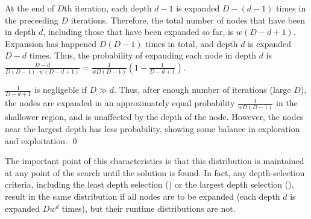 At the end of $D$th iteration,
each depth $d-1$ is expanded $D-(d-1)$ times in the preceeding $D$ iterations.
Therefore, the total number of nodes that have been in depth $d$, including those
that have been expanded so far, is $w(D-d+1)$.
Expansion has happened $D(D-1)$ times in total, and depth $d$ is expanded $D-d$ times.
Thus, the probability of expanding each node in depth $d$ is
$\frac{D-d}{D(D-1)\cdot w(D-d+1)}=\frac{1}{wD(D-1)}(1-\frac{1}{D-d+1})$.

$\frac{1}{D-d+1}$ is negligeble if $D \gg d$.
Thus, after enough number of iterations (large $D$), the nodes are 
expanded in an approximately equal probability $\frac{1}{wD(D-1)}$ in the shallower region, and is
unaffected by the depth of the node.
However, the nodes near the largest depth has less probability, showing
some balance in exploration and exploitation. \qed

The important point of this characteristics is that this
distribution is maintained at any point of the search until the solution
is found. In fact, any depth-selection criteria, including the least
depth selection (\fifo) or the largest depth selection (\lifo), 
result in the same distribution if all nodes are to be expanded (each
depth $d$ is expanded $Dw^d$ times), but their
runtime distributions are not.
